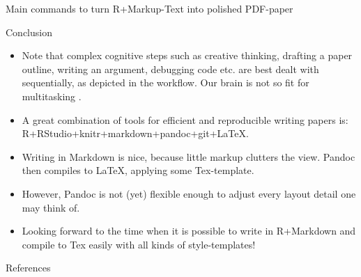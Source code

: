 \documentclass[final,hyperref={pdfpagelabels=false}]{beamer}
\begin{document}
\begin{frame}{}
\begin{columns}[t]
\begin{column}{.48\linewidth}
\begin{block}{Main commands to turn R+Markup-Text into polished PDF-paper}
        \end{block}
        
        
        
        \begin{block}{Conclusion}
            \begin{itemize}
            \item Note that complex cognitive steps such as creative thinking, drafting a paper outline, writing an argument, debugging code etc. are best dealt with sequentially, as depicted in the workflow. Our brain is not so fit for multitasking \cite{Clapp2011}.
             \item A great combination of tools for efficient and reproducible writing papers is: R+RStudio+knitr+markdown+pandoc+git+\LaTeX.    
             \item Writing in Markdown is nice, because little markup clutters the view. Pandoc then compiles to \LaTeX, applying some Tex-template.
             \item However,  Pandoc is not (yet) flexible enough to adjust every layout detail one may think of. 
             \item Looking forward to the time when it is possible to write in R+Markdown and compile to Tex easily with all kinds of style-templates!
                \end{itemize}
        \end{block}     



     \begin{block}{References}
     \begin{tiny}
   
     
     
     \end{tiny}
     \end{block}     
   
   
         \end{column}
    \end{columns}
  \end{frame}
\end{document}
